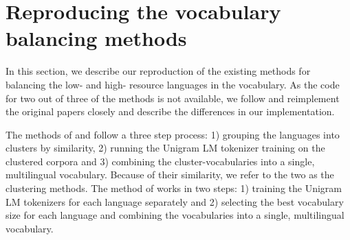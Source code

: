 \section{Reproducing the vocabulary balancing methods}
\label{sec:reproducing_the_vocabulary_balancing_methods}


In this section, we describe our reproduction of the existing methods for balancing the low- and high- resource languages in the vocabulary. As the code for two out of three of the methods is not available, we follow and reimplement the original papers closely and describe the differences in our implementation.

The methods of \citet{chung_improving_2020} and \citet{liang_xlm-v_2023} follow a three step process: 1) grouping the languages into clusters by similarity, 2) running the Unigram LM tokenizer training on the clustered corpora and 3) combining the cluster-vocabularies into a single, multilingual vocabulary. Because of their similarity, we refer to the two as the clustering methods. The method of \citet{zheng_allocating_2021} works in two steps: 1) training the Unigram LM tokenizers for each language separately and 2) selecting the best vocabulary size for each language and combining the vocabularies into a single, multilingual vocabulary.

